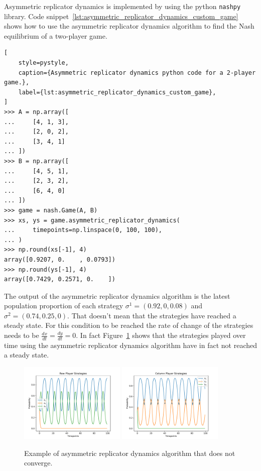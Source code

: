 Asymmetric replicator dynamics is implemented by using the python
\texttt{nashpy} library.
Code snippet~\ref{lst:asymmetric_replicator_dynamics_custom_game} shows how to
use the asymmetric replicator dynamics
algorithm to find the Nash equilibrium of a two-player game.


\begin{lstlisting}[
    style=pystyle,
    caption={Asymmetric replicator dynamics python code for a 2-player game.},
    label={lst:asymmetric_replicator_dynamics_custom_game},
]
>>> A = np.array([
...     [4, 1, 3],
...     [2, 0, 2],
...     [3, 4, 1]
... ])
>>> B = np.array([
...     [4, 5, 1],
...     [2, 3, 2],
...     [6, 4, 0]
... ])
>>> game = nash.Game(A, B)
>>> xs, ys = game.asymmetric_replicator_dynamics(
...     timepoints=np.linspace(0, 100, 100),
... )
>>> np.round(xs[-1], 4)
array([0.9207, 0.    , 0.0793])
>>> np.round(ys[-1], 4)
array([0.7429, 0.2571, 0.    ])

\end{lstlisting}

The output of the asymmetric replicator dynamics algorithm is the latest
population proportion of each strategy \(\sigma^1 = (0.92, 0, 0.08)\) and
\(\sigma^2 = (0.74, 0.25, 0)\).
That doesn't mean that the strategies have reached a steady state.
For this condition to be reached the rate of change of the strategies needs to
be \(\frac{dx}{dt} = \frac{dy}{dt} = 0\).
In fact Figure~\ref{fig:asymmetric_replicator_dynamics} shows that the
strategies played over time using the asymmetric replicator dynamics algorithm
have in fact not reached a steady state.

\begin{figure}[H]
    \centering
    \includegraphics[width=0.45\textwidth]{chapters/04_game_theoretic_model/Bin/learning_algorithms_example/asymmetric_rd_row.pdf}
    \includegraphics[width=0.45\textwidth]{chapters/04_game_theoretic_model/Bin/learning_algorithms_example/asymmetric_rd_col.pdf}
    \caption{Example of asymmetric replicator dynamics algorithm that does
    not converge.}
    \label{fig:asymmetric_replicator_dynamics}
\end{figure}

